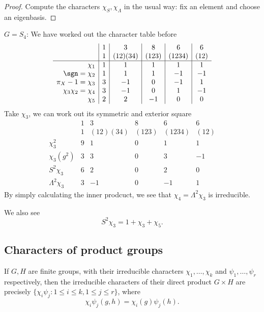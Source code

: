 \documentclass[a4paper]{article}
\theoremstyle{definition}
\begin{document}
\begin{proof}
  Compute the characters \(\chi_S, \chi_\Lambda\) in the usual way: fix an element and choose an eigenbasis.
\end{proof}

\begin{eg}
  \(G = S_4\): We have worked out the character table before
  \[
    \begin{array}{r|c|c|c|c|c}
      & 1 & 3 & 8 & 6 & 6 \\
      & 1 & (12)(34) & (123) & (1234) & (12) \\ \hline
      \chi_1 & 1 & 1 & 1 & 1 & 1 \\
      \sgn = \chi_2 & 1 & 1 & 1 & -1 & -1  \\
      \pi_X - 1 = \chi_3 & 3 & -1 & 0 & -1 & 1 \\
      \chi_3 \chi_2 = \chi_4 & 3 & -1 & 0 & 1 & -1 \\
      \chi_5 & 2 & 2 & -1 & 0 & 0
    \end{array}
  \]
  Take \(\chi_3\), we can work out its symmetric and exterior square
  \[
    \begin{array}{r|c|c|c|c|c}
      & 1 & 3 & 8 & 6 & 6 \\
      & 1 & (12)(34) & (123) & (1234) & (12) \\ \hline
      \chi_3^2 & 9 & 1 & 0 & 1 & 1 \\
      \chi_3(g^2) & 3 & 3 & 0 & 3 & -1 \\
      S^2 \chi_3 & 6 & 2 & 0 & 2 & 0 \\
      \Lambda^2 \chi_3 & 3 & -1 & 0 & -1 & 1
    \end{array}
  \]
  By simply calculating the inner prodcuct, we see that \(\chi_4 = \Lambda^2\chi_3\) is irreducible.

  We also see
  \[
    S^2 \chi_3 = 1 + \chi_3 + \chi_5.
  \]
\end{eg}

\subsection{Characters of product groups}

\begin{proposition}
  If \(G, H\) are finite groups, with their irreducible characters \(\chi_1, \dots, \chi_k\) and \(\psi_1, \dots, \psi_r\) respectively, then the irreducible characters of their direct product \(G \times H\) are precisely \(\{\chi_i \psi_j: 1 \leq i \leq k, 1 \leq j \leq r\}\), where
  \[
    \chi_i \psi_j (g, h) = \chi_i(g) \psi_j(h).
  \]
\end{proposition}
\end{document}
